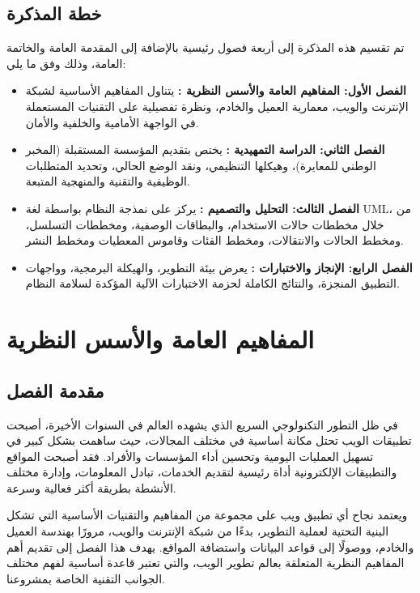 \documentclass{bts-report-ar}
\begin{document}
\section*{خطة المذكرة}
تم تقسيم هذه المذكرة إلى أربعة فصول رئيسية بالإضافة إلى المقدمة العامة والخاتمة العامة، وذلك وفق ما يلي:
\begin{itemize}
  \item \textbf{الفصل الأول: المفاهيم العامة والأسس النظرية :} يتناول المفاهيم الأساسية لشبكة الإنترنت والويب، معمارية العميل والخادم، ونظرة تفصيلية على التقنيات المستعملة في الواجهة الأمامية والخلفية والأمان.
  \item \textbf{الفصل الثاني: الدراسة التمهيدية :} يختص بتقديم المؤسسة المستقبلة (المخبر الوطني للمعايرة)، وهيكلها التنظيمي، ونقد الوضع الحالي، وتحديد المتطلبات الوظيفية والتقنية والمنهجية المتبعة.
  \item \textbf{الفصل الثالث: التحليل والتصميم :} يركز على نمذجة النظام بواسطة لغة UML، من خلال مخططات حالات الاستخدام، والبطاقات الوصفية، ومخططات التسلسل، ومخطط الحالات والانتقالات، ومخطط الفئات وقاموس المعطيات ومخطط النشر.
  \item \textbf{الفصل الرابع: الإنجاز والاختبارات :} يعرض بيئة التطوير، والهيكلة البرمجية، وواجهات التطبيق المنجزة، والنتائج الكاملة لحزمة الاختبارات الآلية المؤكدة لسلامة النظام.
\end{itemize}


\chapter{المفاهيم العامة والأسس النظرية}

\section*{مقدمة الفصل}
في ظل التطور التكنولوجي السريع الذي يشهده العالم في السنوات الأخيرة، أصبحت تطبيقات الويب تحتل مكانة أساسية في مختلف المجالات، حيث ساهمت بشكل كبير في تسهيل العمليات اليومية وتحسين أداء المؤسسات والأفراد. فقد أصبحت المواقع والتطبيقات الإلكترونية أداة رئيسية لتقديم الخدمات، تبادل المعلومات، وإدارة مختلف الأنشطة بطريقة أكثر فعالية وسرعة.

ويعتمد نجاح أي تطبيق ويب على مجموعة من المفاهيم والتقنيات الأساسية التي تشكل البنية التحتية لعملية التطوير، بدءًا من شبكة الإنترنت والويب، مرورًا بهندسة العميل والخادم، ووصولًا إلى قواعد البيانات واستضافة المواقع. يهدف هذا الفصل إلى تقديم أهم المفاهيم النظرية المتعلقة بعالم تطوير الويب، والتي تعتبر قاعدة أساسية لفهم مختلف الجوانب التقنية الخاصة بمشروعنا.
\end{document}

